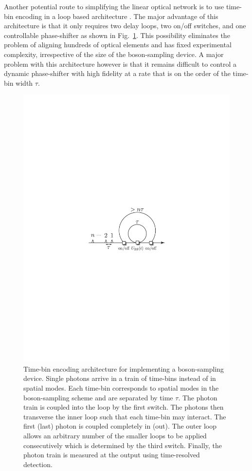 \documentclass[aps,pra,twocolumn,amsmath,amssymb,nofootinbib,superscriptaddress]{revtex4}
\begin{document}
Another potential route to simplifying the linear optical network is to use time-bin encoding in a loop based architecture \cite{bib:motes2014scalable}. The major advantage of this architecture is that it only requires two delay loops, two on/off switches, and one controllable phase-shifter as shown in Fig.~\ref{fig:fiber_loop}. This possibility eliminates the problem of aligning hundreds of optical elements and has fixed experimental complexity, irrespective of the size of the boson-sampling device. A major problem with this architecture however is that it remains difficult to control a dynamic phase-shifter with high fidelity at a rate that is on the order of the time-bin width $\tau$.

\begin{figure}[!htb]
\includegraphics[width=0.7\columnwidth]{fiber_loop}
\caption{Time-bin encoding architecture for implementing a boson-sampling device. Single photons arrive in a train of time-bins instead of in spatial modes. Each time-bin corresponds to spatial modes in the boson-sampling scheme and are separated by time $\tau$. The photon train is coupled into the loop by the first switch. The photons then transverse the inner loop such that each time-bin may interact. The first (last) photon is coupled completely in (out). The outer loop allows an arbitrary number of the smaller loops to be applied consecutively which is determined by the third switch. Finally, the photon train is measured at the output using time-resolved detection.}
\label{fig:fiber_loop}
\end{figure}
\end{document}
